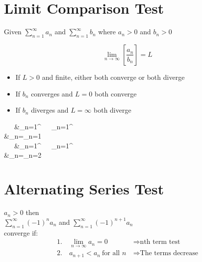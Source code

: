 \documentclass[a4paper]{article}
\begin{document}
\section{Limit Comparison Test}
	Given $\sum\limits_{n=1}^{\infty}{a_n}$ and $\sum\limits_{n=1}^{\infty}{b_n}$ where $a_{n}>0$ and $b_{n}>0$
	\\
	\begin{multicols}{2}
		\begin{equation*}
		\lim\limits_{n\rightarrow\infty}\left[\frac{a_n}{b_n}\right]=L
		\end{equation*}
		\columnbreak
		\begin{itemize}
		\item If $L>0$ and finite, either both converge or both diverge
		\item If $b_n$ converges and $L=0$ both converge
		\item If $b_n$ diverges and $L=\infty$ both diverge
		\end{itemize}
	\end{multicols}
	\begin{flalign*}
	\ \ \ &\sum\limits_{n=1}^{\infty}{}\ \ \ \sum\limits_{n=1}^{\infty}{}\\
	&\lim\limits_{n\rightarrow\infty}=\lim\limits_{n\rightarrow\infty}{}=1\\
	\ \ \ &\sum\limits_{n=1}^{\infty}{}\ \ \ \sum\limits_{n=1}^{\infty}{}\\
	&\lim\limits_{n\rightarrow\infty}=\lim\limits_{n\rightarrow\infty}{}=2
	\end{flalign*}
\section{Alternating Series Test}
	$a_{n}>0$ then\\
	$\sum\limits_{n=1}^{\infty}{\left(-1\right)^{n}a_n}$ and $\sum\limits_{n=1}^{\infty}{\left(-1\right)^{n+1}a_n}$\\
	converge if:\\
	{\setlength{\abovedisplayskip}{0pt}
	\begin{align*}
	 1.\ &\lim\limits_{n\rightarrow\infty}{a_n}=0\ &\Rightarrow \text{nth term test}\\
	 2.\ &a_{n+1}<a_n\ \text{for all $n$}\ &\Rightarrow \text{The terms decrease}
	\end{align*}
	}
\end{document}
